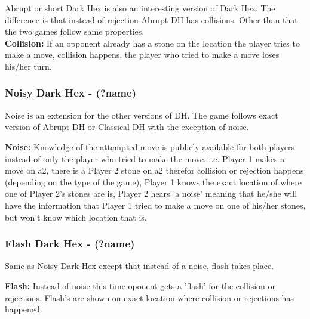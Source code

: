 Abrupt or short Dark Hex is also an interesting version of Dark Hex. The difference is that instead of rejection Abrupt DH has collisions. Other than that the two games follow same properties.\\

{\bf Collision:} If an opponent already has a stone on the location the player tries to make a move, collision happens, the player who tried to make a move loses his/her turn.

\subsubsection{Noisy Dark Hex - (?name)}

Noise is an extension for the other versions of DH. The game follows exact version of Abrupt DH or Classical DH with the exception of noise.

{\bf Noise:} Knowledge of the attempted move is publicly available for both players instead of only the player who tried to make the move. i.e. Player 1 makes a move on a2, there is a Player 2 stone on a2 therefor collision or rejection happens (depending on the type of the game), Player 1 knows the exact location of where one of Player 2's stones are is, Player 2 hears 'a noise' meaning that he/she will have the information that Player 1 tried to make a move on one of his/her stones, but won't know which location that is.

\subsubsection{Flash Dark Hex - (?name)}

Same as Noisy Dark Hex except that instead of a noise, flash takes place.

{\bf Flash:} Instead of noise this time oponent gets a 'flash' for the collision or rejections. Flash's are shown on exact location where collision or rejections has happened.  
